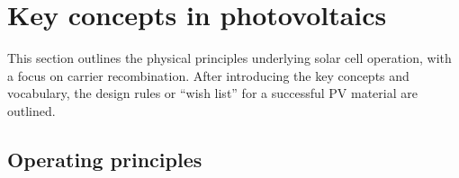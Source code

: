 







\section{Key concepts in photovoltaics}

This section outlines the physical principles underlying solar cell operation, with a focus on carrier recombination. After introducing the key concepts and vocabulary, the design rules or ``wish list'' for a successful PV material are outlined. 

\subsection{Operating principles} \label{operatingprinciples}

